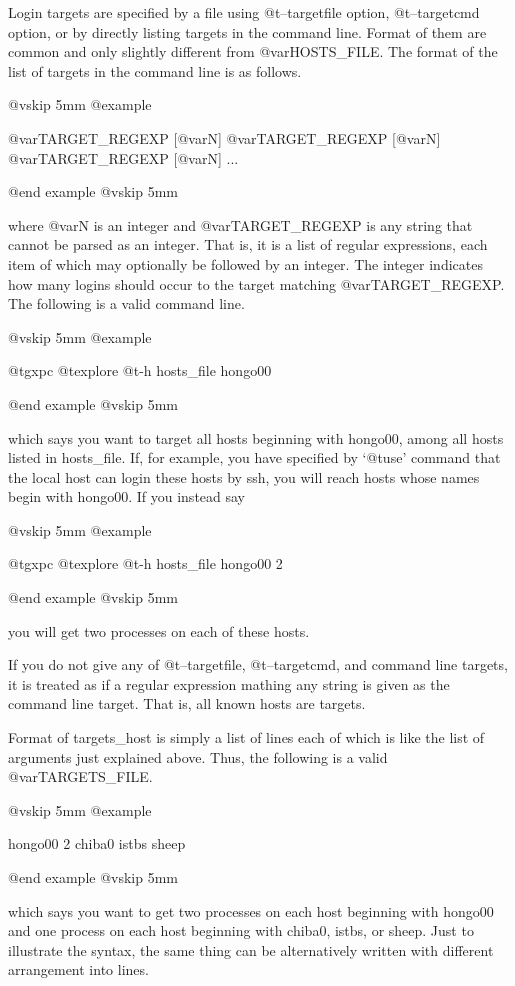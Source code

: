 Login targets are specified by a file using @t{--targetfile} option,
@t{--targetcmd} option, or by directly listing targets in the command
line. Format of them are common and only slightly different from
@var{HOSTS_FILE}.  The format of the list of targets in the command
line is as follows.

@vskip 5mm
@example

   @var{TARGET_REGEXP} [@var{N}] @var{TARGET_REGEXP} [@var{N}] @var{TARGET_REGEXP} [@var{N}] ...

@end example
@vskip 5mm

where @var{N} is an integer and @var{TARGET_REGEXP} is any string that cannot
be parsed as an integer. That is, it is a list of regular
expressions, each item of which may optionally be followed by an
integer. The integer indicates how many logins should occur to
the target matching @var{TARGET_REGEXP}. The following is a valid
command line.

@vskip 5mm
@example

  @t{gxpc} @t{explore} @t{-h} hosts_file hongo00

@end example
@vskip 5mm

which says you want to target all hosts beginning with hongo00,
among all hosts listed in hosts_file.  If, for example, you have
specified by `@t{use}' command that the local host can login these
hosts by ssh, you will reach hosts whose names begin with
hongo00.  If you instead say

@vskip 5mm
@example

  @t{gxpc} @t{explore} @t{-h} hosts_file hongo00 2

@end example
@vskip 5mm

you will get two processes on each of these hosts.

If you do not give any of @t{--targetfile}, @t{--targetcmd}, and command
line targets, it is treated as if a regular expression mathing
any string is given as the command line target. That is, all
known hosts are targets.

Format of targets_host is simply a list of lines each of which
is like the list of arguments just explained above. Thus, the
following is a valid @var{TARGETS_FILE}.

@vskip 5mm
@example

  hongo00 2
  chiba0
  istbs
  sheep

@end example
@vskip 5mm

which says you want to get two processes on each host beginning
with hongo00 and one process on each host beginning with chiba0,
istbs, or sheep. Just to illustrate the syntax, the same thing
can be alternatively written with different arrangement into
lines.

